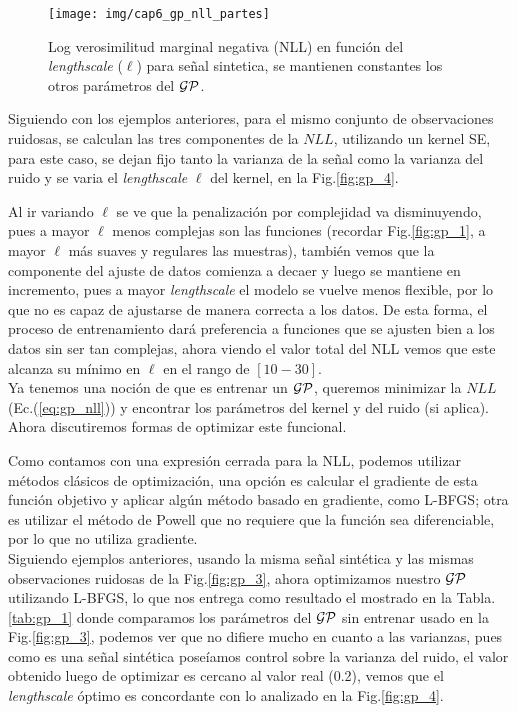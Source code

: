 \begin{figure}[H]
	\centering
	\texttt{[image: img/cap6\_gp\_nll\_partes]}
	\caption{Log verosimilitud marginal negativa (NLL) en función del \textit{lengthscale} ($\ell$) para señal sintetica, se mantienen constantes los otros parámetros del $\mathcal{GP}$.}\label{fig:gp_4}
	\label{fig:nll_por partes}
\end{figure}

Siguiendo con los ejemplos anteriores, para el mismo conjunto de observaciones ruidosas, se calculan las tres componentes de la $NLL$, utilizando un kernel SE, para este caso, se dejan fijo tanto la varianza de la señal como la varianza del ruido y se varia el \textit{lengthscale} $\ell$ del kernel, en la Fig.\ref{fig:gp_4}.

Al ir variando $\ell$ se ve que la penalización por complejidad va disminuyendo, pues a mayor $\ell$ menos complejas son las funciones (recordar Fig.\ref{fig:gp_1}, a mayor $\ell$ más suaves y regulares las muestras), también vemos que la componente del ajuste de datos comienza a decaer y luego se mantiene en incremento, pues a mayor \textit{lengthscale} el modelo se vuelve menos flexible, por lo que no es capaz de ajustarse de manera correcta a los datos. De esta forma, el proceso de entrenamiento dará preferencia a funciones que se ajusten bien a los datos sin ser tan complejas, ahora viendo el valor total del NLL vemos que este alcanza su mínimo en $\ell$ en el rango de $[10-30]$.\\


Ya tenemos una noción de que es entrenar un $\mathcal{GP}$, queremos minimizar la $NLL$ (Ec.(\ref{eq:gp_nll})) y encontrar los parámetros del kernel y del ruido (si aplica). Ahora discutiremos formas de optimizar este funcional.\\


Como contamos con una expresión cerrada para la NLL, podemos utilizar métodos clásicos de optimización, una opción es calcular el gradiente de esta función objetivo y aplicar algún método basado en gradiente, como L-BFGS; otra es utilizar el método de Powell que no requiere que la función sea diferenciable, por lo que no utiliza gradiente.\\


Siguiendo ejemplos anteriores, usando la misma señal sintética y las mismas observaciones ruidosas de la Fig.\ref{fig:gp_3}, ahora optimizamos nuestro $\mathcal{GP}$ utilizando L-BFGS, lo que nos entrega como resultado el mostrado en la Tabla.\ref{tab:gp_1} donde comparamos los parámetros del $\mathcal{GP}$ sin entrenar usado en la Fig.\ref{fig:gp_3}, podemos ver que no difiere mucho en cuanto a las varianzas, pues como es una señal sintética poseíamos control sobre la varianza del ruido, el valor obtenido luego de optimizar es cercano al valor real (0.2), vemos que el \textit{lengthscale} óptimo es concordante con lo analizado en la Fig.\ref{fig:gp_4}.

